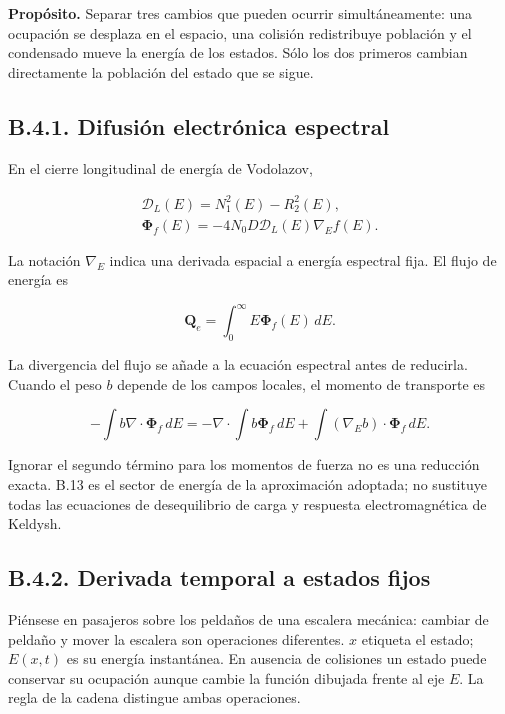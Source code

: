 \documentclass[
  spanish,
  10pt,
  a4paper,
]{article}
\begin{document}
\textbf{Propósito.} Separar tres cambios que pueden ocurrir
simultáneamente: una ocupación se desplaza en el espacio, una colisión
redistribuye población y el condensado mueve la energía de los estados.
Sólo los dos primeros cambian directamente la población del estado que
se sigue.

\subsection{B.4.1. Difusión electrónica
espectral}\label{b.4.1.-difusiuxf3n-electruxf3nica-espectral}

En el cierre longitudinal de energía de Vodolazov,

\[
\begin{gathered}
\mathcal D_L(E)=N_1^2(E)-R_2^2(E),\\
\boldsymbol\Phi_f(E)=-4N_0D\mathcal D_L(E)\nabla_E f(E).
\end{gathered} \tag{B.13}
\]

La notación \(\nabla_E\) indica una derivada espacial a energía
espectral fija. El flujo de energía es

\[
\mathbf Q_e=\int_0^\infty E\boldsymbol\Phi_f(E)\,dE.
\tag{B.14}
\]

La divergencia del flujo se añade a la ecuación espectral antes de
reducirla. Cuando el peso \(b\) depende de los campos locales, el
momento de transporte es

\[
-\int b\nabla\cdot\boldsymbol\Phi_f\,dE
=-\nabla\cdot\int b\boldsymbol\Phi_f\,dE
+\int(\nabla_Eb)\cdot\boldsymbol\Phi_f\,dE. \tag{B.15}
\]

Ignorar el segundo término para los momentos de fuerza no es una
reducción exacta. B.13 es el sector de energía de la aproximación
adoptada; no sustituye todas las ecuaciones de desequilibrio de carga y
respuesta electromagnética de Keldysh.

\subsection{B.4.2. Derivada temporal a estados
fijos}\label{b.4.2.-derivada-temporal-a-estados-fijos}

Piénsese en pasajeros sobre los peldaños de una escalera mecánica:
cambiar de peldaño y mover la escalera son operaciones diferentes. \(x\)
etiqueta el estado; \(E(x,t)\) es su energía instantánea. En ausencia de
colisiones un estado puede conservar su ocupación aunque cambie la
función dibujada frente al eje \(E\). La regla de la cadena distingue
ambas operaciones.
\end{document}
